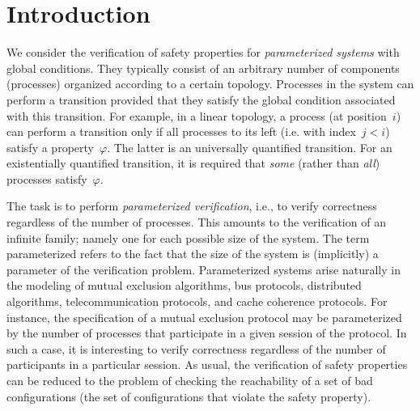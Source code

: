 \section{Introduction}
\label{section:introduction}
%
We consider the verification of safety properties for
\emph{parameterized systems} with global
conditions. %
They typically consist of an arbitrary number of components
(processes) organized according to a certain topology. %
%
Processes in the system can perform a transition provided that they
satisfy the global condition associated with this transition. %
For example, in a linear topology, a process (at position~$i$) can
perform a transition only if all processes to its left (i.e. with
index~$j<i$) satisfy a property~$\varphi$. The latter is an
universally quantified transition. %
For an existentially quantified transition, it is required that
\emph{some} (rather than \emph{all}) processes satisfy~$\varphi$.
%

%
The task is to perform \emph{parameterized verification}, i.e., to
verify correctness regardless of the number of processes. %
This amounts to the verification of an infinite family; namely one for
each possible size of the system. %
The term parameterized refers to the fact that the size of the system
is (implicitly) a parameter of the verification problem. %
%
Parameterized systems arise naturally in the modeling of mutual
exclusion algorithms, bus protocols, distributed algorithms,
telecommunication protocols, and cache coherence protocols. %
For instance, the specification of a mutual exclusion protocol may be
parameterized by the number of processes that participate in a given
session of the protocol. %
%
In such a case, it is interesting to verify correctness regardless of
the number of participants in a particular session. %
As usual, the verification of safety properties can be reduced to the
problem of checking the reachability of a set of bad configurations
(the set of configurations that violate the safety property).

